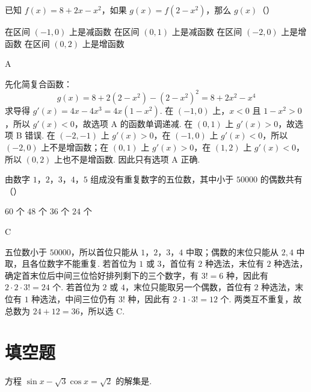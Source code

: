 \begin{problem}
已知 \(f(x) = 8 + 2x - x^2\)，如果 \(g(x) = f(2 - x^2)\)，那么 \(g(x)\)（\quad）

\choices
    {在区间 \((-1,0)\) 上是减函数}
    {在区间 \((0,1)\) 上是减函数}
    {在区间 \((-2,0)\) 上是增函数}
    {在区间 \((0,2)\) 上是增函数}
\end{problem}

\begin{answer}
A
\end{answer}

\begin{solution}
先化简复合函数：
\[
g(x)=8+2(2-x^2)-(2-x^2)^2=8+2x^2-x^4
\]
求导得 \(g'(x)=4x-4x^3=4x(1-x^2)\). 在 \((-1,0)\) 上，\(x<0\) 且 \(1-x^2>0\)，所以 \(g'(x)<0\)，故选项 A 的函数单调递减. 在 \((0,1)\) 上 \(g'(x)>0\)，故选项 B 错误. 在 \((-2,-1)\) 上 \(g'(x)>0\)，在 \((-1,0)\) 上 \(g'(x)<0\)，所以 \((-2,0)\) 上不是增函数；在 \((0,1)\) 上 \(g'(x)>0\)，在 \((1,2)\) 上 \(g'(x)<0\)，所以 \((0,2)\) 上也不是增函数. 因此只有选项 A 正确.
\end{solution}

\begin{problem}
由数字 \(1\)，\(2\)，\(3\)，\(4\)，\(5\) 组成没有重复数字的五位数，其中小于 \(50000\) 的偶数共有（\quad）

\choices
    {\(60\text{ 个}\)}
    {\(48\text{ 个}\)}
    {\(36\text{ 个}\)}
    {\(24\text{ 个}\)}
\end{problem}

\begin{answer}
C
\end{answer}

\begin{solution}
五位数小于 \(50000\)，所以首位只能从 \(1\)，\(2\)，\(3\)，\(4\) 中取；偶数的末位只能从 \(2,4\) 中取，且各位数字不能重复. 若首位为 \(1\) 或 \(3\)，首位有 \(2\) 种选法，末位有 \(2\) 种选法，确定首末位后中间三位恰好排列剩下的三个数字，有 \(3!=6\) 种，因此有 \(2\cdot2\cdot3!=24\) 个. 若首位为 \(2\) 或 \(4\)，末位只能取另一个偶数，首位有 \(2\) 种选法，末位有 \(1\) 种选法，中间三位仍有 \(3!\) 种，因此有 \(2\cdot1\cdot3!=12\) 个. 两类互不重复，故总数为 \(24+12=36\)，所以选 C.
\end{solution}

\section{填空题}

\begin{problem}
方程 \(\sin x - \sqrt{3}\cos x = \sqrt{2}\) 的解集是\fillinblank{}.
\end{problem}

